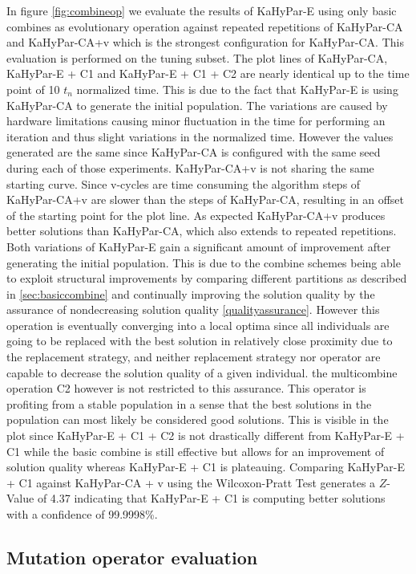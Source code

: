 \documentclass[a4paper,12pt,titlepage, BCOR7mm,headsepline]{scrbook}
\numberwithin{equation}{section}
\begin{document}
In figure \ref{fig:combineop} we evaluate the results of KaHyPar-E using only basic combines as evolutionary operation against repeated repetitions of KaHyPar-CA and KaHyPar-CA+v which is the strongest configuration for KaHyPar-CA. This evaluation is performed on the tuning subset. The plot lines of KaHyPar-CA, KaHyPar-E + C1 and KaHyPar-E + C1 + C2 are nearly identical up to the time point of 10 $t_n$ normalized time. This is due to the fact that KaHyPar-E is using KaHyPar-CA to generate the initial population. The variations are caused by hardware limitations causing minor fluctuation in the time for performing an iteration and thus slight variations in the normalized time. However the values generated are the same since KaHyPar-CA is configured with the same seed during each of those experiments. KaHyPar-CA+v is not sharing the same starting curve. Since v-cycles are time consuming the algorithm steps of KaHyPar-CA+v are slower than the steps of KaHyPar-CA, resulting in an offset of the starting point for the plot line. As expected KaHyPar-CA+v produces better solutions than KaHyPar-CA, which also extends to repeated repetitions. Both variations of KaHyPar-E gain a significant amount of improvement after generating the initial population. This is due to the combine schemes being able to exploit structural improvements by comparing different partitions as described in \ref{sec:basiccombine} and continually improving the solution quality by the assurance of nondecreasing solution quality \ref{qualityassurance}. However this operation is eventually converging into a local optima since all individuals are going to be replaced with the best solution in relatively close proximity due to the replacement strategy, and neither replacement strategy nor operator are capable to decrease the solution quality of a given individual. the multicombine operation C2 however is not restricted to this assurance. This operator is profiting from a stable population in a sense that the best solutions in the population can most likely be considered good solutions. This is visible in the plot since KaHyPar-E + C1 + C2 is not drastically different from KaHyPar-E + C1 while the basic combine is still effective but allows for an improvement of solution quality whereas KaHyPar-E + C1 is plateauing. Comparing KaHyPar-E + C1 against KaHyPar-CA + v using the Wilcoxon-Pratt Test generates a $Z$-Value of 4.37 indicating that KaHyPar-E + C1 is computing better solutions with a confidence of 99.9998\%.
\subsection{Mutation operator evaluation}
\end{document}
